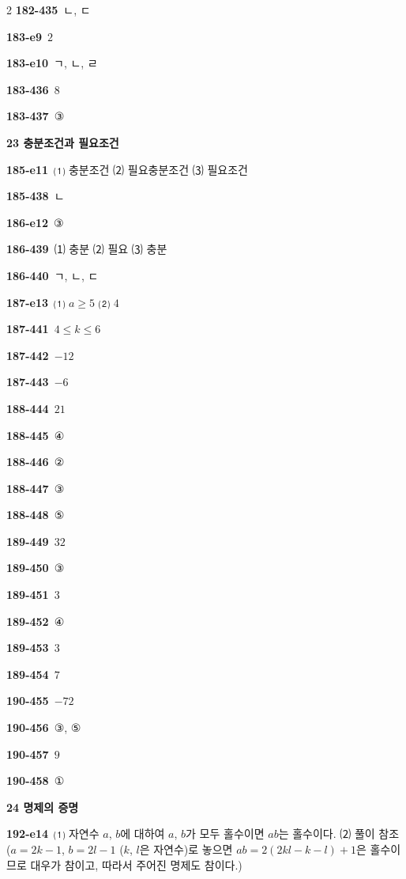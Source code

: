 \documentclass[10pt,a4paper]{article}
\begin{document}
\begin{multicols}{2}
\noindent\textbf{182-435}\ ㄴ, ㄷ\par
\noindent\textbf{183-e9}\ $2$\par
\noindent\textbf{183-e10}\ ㄱ, ㄴ, ㄹ\par
\noindent\textbf{183-436}\ $8$\par
\noindent\textbf{183-437}\ ③\par
\noindent\textbf{23 충분조건과 필요조건}\par\smallskip
\noindent\textbf{185-e11}\ ⑴ 충분조건 ⑵ 필요충분조건 ⑶ 필요조건\par
\noindent\textbf{185-438}\ ㄴ\par
\noindent\textbf{186-e12}\ ③\par
\noindent\textbf{186-439}\ ⑴ 충분 ⑵ 필요 ⑶ 충분\par
\noindent\textbf{186-440}\ ㄱ, ㄴ, ㄷ\par
\noindent\textbf{187-e13}\ ⑴ $a\ge 5$ ⑵ $4$\par
\noindent\textbf{187-441}\ $4\le k\le 6$\par
\noindent\textbf{187-442}\ $-12$\par
\noindent\textbf{187-443}\ $-6$\par
\noindent\textbf{188-444}\ $21$\par
\noindent\textbf{188-445}\ ④\par
\noindent\textbf{188-446}\ ②\par
\noindent\textbf{188-447}\ ③\par
\noindent\textbf{188-448}\ ⑤\par
\noindent\textbf{189-449}\ $32$\par
\noindent\textbf{189-450}\ ③\par
\noindent\textbf{189-451}\ $3$\par
\noindent\textbf{189-452}\ ④\par
\noindent\textbf{189-453}\ $3$\par
\noindent\textbf{189-454}\ $7$\par
\noindent\textbf{190-455}\ $-72$\par
\noindent\textbf{190-456}\ ③, ⑤\par
\noindent\textbf{190-457}\ $9$\par
\noindent\textbf{190-458}\ ①\par
\noindent\textbf{24 명제의 증명}\par\smallskip
\noindent\textbf{192-e14}\ ⑴ 자연수 $a$, $b$에 대하여 $a$, $b$가 모두 홀수이면 $ab$는 홀수이다. ⑵ 풀이 참조 ($a=2k-1$, $b=2l-1$ ($k$, $l$은 자연수)로 놓으면 $ab=2(2kl-k-l)+1$은 홀수이므로 대우가 참이고, 따라서 주어진 명제도 참이다.)\par

\end{multicols}
\end{document}
